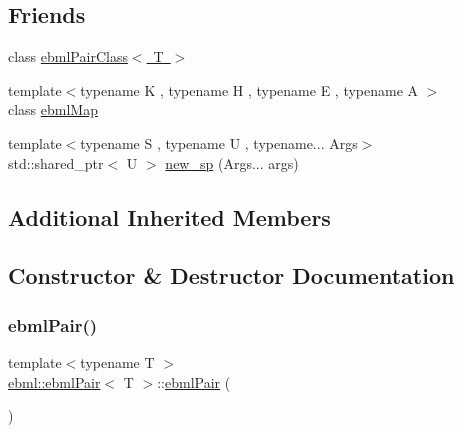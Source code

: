 \subsection*{Friends}
\begin{DoxyCompactItemize}
\item 
class \mbox{\hyperlink{classebml_1_1ebmlPair_a5e73cd835193fd285beab865e019a429}{ebml\+Pair\+Class$<$ T $>$}}
\item 
{\footnotesize template$<$typename K , typename H , typename E , typename A $>$ }\\class \mbox{\hyperlink{classebml_1_1ebmlPair_a5e601ae5dd2ba30dd0cb454b0fa1669b}{ebml\+Map}}
\item 
{\footnotesize template$<$typename S , typename U , typename... Args$>$ }\\std\+::shared\+\_\+ptr$<$ U $>$ \mbox{\hyperlink{classebml_1_1ebmlPair_ace404b6adc012cac5ccd9c03160456e3}{new\+\_\+sp}} (Args... args)
\end{DoxyCompactItemize}
\subsection*{Additional Inherited Members}


\subsection{Constructor \& Destructor Documentation}
\mbox{\label{classebml_1_1ebmlPair_a5dadd29820eb5bca6f5bda996f70f06f}} 
\subsubsection{\texorpdfstring{ebml\+Pair()}{ebmlPair()}}
{\footnotesize\ttfamily template$<$typename T $>$ \\
\mbox{\hyperlink{classebml_1_1ebmlPair}{ebml\+::ebml\+Pair}}$<$ T $>$\+::\mbox{\hyperlink{classebml_1_1ebmlPair}{ebml\+Pair}} (\begin{DoxyParamCaption}\item[{const \mbox{\hyperlink{classebml_1_1ebmlPairClass}{ebml\+Pair\+Class}}$<$ T $>$ $\ast$}]{ }\end{DoxyParamCaption})\hspace{0.3cm}{\ttfamily [protected]}}



